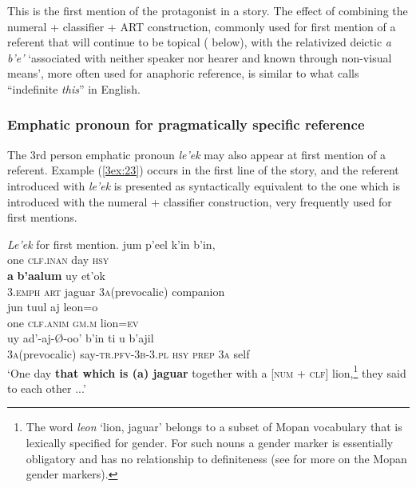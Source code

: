 \documentclass[output=paper]{langsci/langscibook}
\begin{document}
This is the first mention of the protagonist in a story.  The effect of combining the numeral + classifier + ART construction, commonly used for first mention of a referent that will continue to be topical ( below), with the relativized deictic {\emph{a b'e'}} `associated with neither speaker nor hearer and known through non-visual means', more often used for anaphoric reference, is similar to what \cite{prince:81} calls ``indefinite {\emph{this}}'' in English.

\subsubsection{Emphatic pronoun for pragmatically specific reference}\label{3sec:333}

The 3rd person emphatic pronoun {\emph{le'ek}} may also appear at first mention of a referent. Example (\ref{3ex:23}) occurs in the first line of the story, and the referent introduced with {\emph{le'ek}} is presented as syntactically equivalent to the one which is introduced with the numeral + classifier construction, very frequently used for first mentions.


\begin{exe}
\ex\label{3ex:23}
{\emph{Le'ek}} for first mention.  
\exi{}
\gll	jum	p'eel 		k'in 	b'in, \\
	one	{\textsc{clf.inan}}	day	{\textsc{hsy}}	\\
\glt
\exi{}
 	{\textbf{a}} 	{\textbf{b'aalum}} 	uy				et'ok \\
	3.{\textsc{emph}}	{\textsc{art}}		jaguar		{\textsc{3a}}(prevocalic)	companion \\
\glt
\exi{}
\gll	jun 	tuul 			aj 			leon=o \\
	one	{\textsc{clf.anim}}	{\textsc{gm.m}}	lion={\textsc{ev}} \\
\glt 
\exi{}
\gll	uy				ad'-aj-\O-oo'	 			b'in 	ti	 		u	 	b’ajil \\
	{\textsc{3a}}(prevocalic)	say-{\textsc{tr.pfv-3b-3.pl}}	{\textsc{hsy}}	{\textsc{prep}}		{\textsc{3a}}	self \\
\glt `One day {\textbf{that which is (a) jaguar}} together with a [{\textsc{num}} + {\textsc{clf}}] lion,\footnote{The word {\emph{leon}} `lion, jaguar' belongs to a subset of Mopan vocabulary that is lexically specified for gender.  For such nouns a gender marker is essentially obligatory and has no relationship to definiteness (see \citealt{contini:morava:danziger:18} for more on the Mopan gender markers).} they said to each other ...'
\end{exe}
\end{document}
